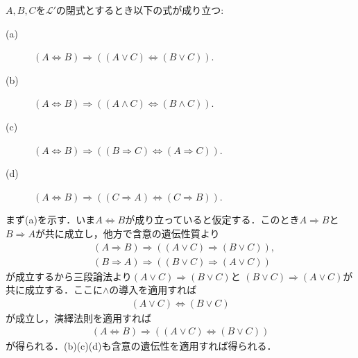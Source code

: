 	\begin{screen}
		\begin{logicalthm}[同値記号の遺伝性質]\label{logicalthm:hereditary_of_equivalence}
			$A,B,C$を$\mathcal{L}'$の閉式とするとき以下の式が成り立つ:
			\begin{description}
				\item[(a)] $(A \Longleftrightarrow B) \Longrightarrow ((A \vee C) \Longleftrightarrow (B \vee C))$.
				\item[(b)] $(A \Longleftrightarrow B) \Longrightarrow ((A \wedge C) \Longleftrightarrow (B \wedge C))$.
				\item[(c)] $(A \Longleftrightarrow B) \Longrightarrow ((B \Longrightarrow C) \Longleftrightarrow (A \Longrightarrow C))$.
				
				\item[(d)] $(A \Longleftrightarrow B) \Longrightarrow ((C \Longrightarrow A) \Longleftrightarrow (C \Longrightarrow B))$.
			\end{description}
		\end{logicalthm}
	\end{screen}
	
	\begin{prf}
		まず(a)を示す．いま$A \Longleftrightarrow B$が成り立っていると仮定する．このとき$A \Longrightarrow B$と
		$B \Longrightarrow A$が共に成立し，他方で含意の遺伝性質より
		\begin{align}
			&(A \Longrightarrow B) \Longrightarrow ((A \vee C) \Longrightarrow (B \vee C)), \\
			&(B \Longrightarrow A) \Longrightarrow ((B \vee C) \Longrightarrow (A \vee C))
		\end{align}
		が成立するから三段論法より$(A \vee C) \Longrightarrow (B \vee C)$と
		$(B \vee C) \Longrightarrow (A \vee C)$が共に成立する．ここに$\wedge$の導入を適用すれば
		\begin{align}
			(A \vee C) \Longleftrightarrow (B \vee C)
		\end{align}
		が成立し，演繹法則を適用すれば
		\begin{align}
			(A \Longleftrightarrow B) \Longrightarrow ((A \vee C) \Longleftrightarrow (B \vee C))
		\end{align}
		が得られる．(b)(c)(d)も含意の遺伝性を適用すれば得られる．
		\QED
	\end{prf}
	
